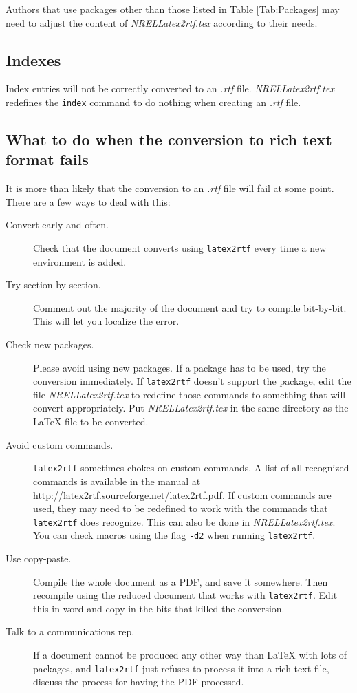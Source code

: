 Authors that use packages other than those listed in Table \ref{Tab:Packages} may need to adjust the content of \emph{NRELLatex2rtf.tex} according to their needs. 

\subsection{Indexes}
Index entries will not be correctly converted to an \emph{.rtf} file. \emph{NRELLatex2rtf.tex} redefines the \verb+index+ command to do nothing when creating an \emph{.rtf} file. 

\subsection{What to do when the conversion to rich text format fails}
It is more than likely that the conversion to an \emph{.rtf} file will fail at some point. There are a few ways to deal with this:

\begin{description}
\item[Convert early and often.] Check that the document converts using \texttt{latex2rtf} every time a new environment is added.
\item[Try section-by-section.] Comment out the majority of the document and try to compile bit-by-bit. This will let you localize the error.
\item[Check new packages.] Please avoid using new packages. If a package has to be used, try the conversion immediately. If \texttt{latex2rtf} doesn't support the package, edit the file \emph{NRELLatex2rtf.tex} to redefine those commands to something that will convert appropriately. Put \emph{NRELLatex2rtf.tex} in the same directory as the LaTeX file to be converted.
\item[Avoid custom commands.] \texttt{latex2rtf} sometimes chokes on custom commands. A list of all recognized commands is available in the manual at \href{http://latex2rtf.sourceforge.net/latex2rtf.pdf}{http://latex2rtf.sourceforge.net/latex2rtf.pdf}. If custom commands are used, they may need to be redefined to work with the commands that \texttt{latex2rtf} does recognize. This can also be done in \emph{NRELLatex2rtf.tex}. You can check macros using the flag \verb+-d2+ when running \texttt{latex2rtf}.
\item[Use copy-paste.] Compile the whole document as a PDF, and save it somewhere. Then recompile using the reduced document that works with \texttt{latex2rtf}. Edit this in word and copy in the bits that killed the conversion.
\item[Talk to a communications rep.] If a document cannot be produced any other way than LaTeX with lots of packages, and \texttt{latex2rtf} just refuses to process it into a rich text file, discuss the process for having the PDF processed.
\end{description}

